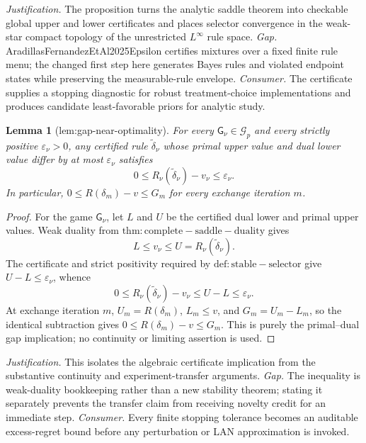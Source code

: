 \documentclass{article}
\newtheorem{lemma}{Lemma}
\begin{document}
\par\smallskip\noindent \textit{Justification.} The proposition turns the analytic saddle theorem into checkable global upper and lower certificates and places selector convergence in the weak-star compact topology of the unrestricted \(L^{\infty}\) rule space. \textit{Gap.} AradillasFernandezEtAl2025Epsilon certifies mixtures over a fixed finite rule menu; the changed first step here generates Bayes rules and violated endpoint states while preserving the measurable-rule envelope. \textit{Consumer.} The certificate supplies a stopping diagnostic for robust treatment-choice implementations and produces candidate least-favorable priors for analytic study.

\begin{lemma}[lem:gap-near-optimality]\label{lem:gap-near-optimality}
For every \(\mathsf G_{\nu}\in\mathcal G_p\) and every strictly positive \(\varepsilon_{\nu}>0\), any certified rule \(\widetilde\delta_{\nu}\) whose primal upper value and dual lower value differ by at most \(\varepsilon_{\nu}\) satisfies \[0\le R_{\nu}(\widetilde\delta_{\nu})-v_{\nu}\le\varepsilon_{\nu}.\] In particular, \(0\le R(\delta_m)-v\le G_m\) for every exchange iteration \(m\).
\end{lemma}
\begin{proof}
For the game \(\mathsf G_{\nu}\), let \(L\) and \(U\) be the certified dual lower and primal upper values. Weak duality from \(\mathrm{thm:complete-saddle-duality}\) gives
\[
 L\leq v_{\nu}\leq U=R_{\nu}(\widetilde\delta_{\nu}).
\]
The certificate and strict positivity required by \(\mathrm{def:stable-selector}\) give \(U-L\leq\varepsilon_{\nu}\), whence
\[
 0\leq R_{\nu}(\widetilde\delta_{\nu})-v_{\nu}
 \leq U-L\leq\varepsilon_{\nu}.
\]
At exchange iteration \(m\), \(U_m=R(\delta_m)\), \(L_m\leq v\), and \(G_m=U_m-L_m\), so the identical subtraction gives \(0\leq R(\delta_m)-v\leq G_m\). This is purely the primal--dual gap implication; no continuity or limiting assertion is used.
\end{proof}
\par\smallskip\noindent \textit{Justification.} This isolates the algebraic certificate implication from the substantive continuity and experiment-transfer arguments. \textit{Gap.} The inequality is weak-duality bookkeeping rather than a new stability theorem; stating it separately prevents the transfer claim from receiving novelty credit for an immediate step. \textit{Consumer.} Every finite stopping tolerance becomes an auditable excess-regret bound before any perturbation or LAN approximation is invoked.
\end{document}
